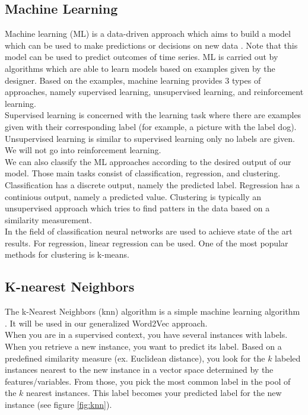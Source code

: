 	\subsection{Machine Learning}
Machine learning (ML) is a data-driven approach which aims to build a model which can be used to make predictions or decisions on new data \cite{ML:article}. Note that this model can be used to predict outcomes of time series. ML is carried out by algorithms which are able to learn models based on examples given by the designer. Based on the examples, machine learning provides $3$ types of approaches, namely supervised learning, unsupervised learning, and reinforcement learning. \\
Supervised learning is concerned with the learning task where there are examples given with their corresponding label (for example, a picture with the label dog). Unsupervised learning is similar to supervised learning only no labels are given. We will not go into reinforcement learning. \\
We can also classify the ML approaches according to the desired output of our model. Those main tasks consist of classification, regression, and clustering. Classification has a discrete output, namely the predicted label. Regression has a continious output, namely a predicted value. Clustering is typically an unsupervised approach which tries to find patters in the data based on a similarity measurement. \\
	
In the field of classification neural networks are used to achieve state of the art results. For regression, linear regression can be used. One of the most popular methods for clustering is k-means. 

	\subsection{K-nearest Neighbors}
	\label{sec:knn}
	
The k-Nearest Neighbors (knn) algorithm is a simple machine learning algorithm \cite{knn:article}. It will be used in our generalized Word2Vec approach. \\
When you are in a supervised context, you have several instances with labels. When you retrieve a new instance, you want to predict its label. Based on a predefined similarity measure (ex. Euclidean distance), you look for the $k$ labeled instances nearest to the new instance in a vector space determined by the features/variables. From those, you pick the most common label in the pool of the $k$ nearest instances. This label becomes your predicted label for the new instance (see figure \ref{fig:knn}).


